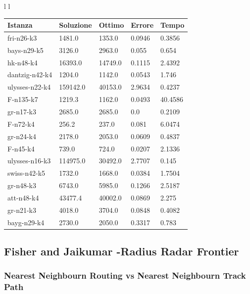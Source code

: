 \documentclass[]{article}
\begin{document}
\begin{tabular}{l l}
			\begin{tabular}{||l | l l l l||} 
				\hline
				Istanza & Soluzione & Ottimo & Errore & Tempo \\ [0.5ex] 
				\hline\hline
				fri-n26-k3 & 1481.0 & 1353.0 & 0.0946 & 0.3856  \\
				bays-n29-k5 & 3126.0 & 2963.0 & 0.055 & 0.654  \\
				hk-n48-k4 & 16393.0 & 14749.0 & 0.1115 & 2.4392  \\
				dantzig-n42-k4 & 1204.0 & 1142.0 & 0.0543 & 1.746  \\
				ulysses-n22-k4 & 159142.0 & 40153.0 & 2.9634 & 0.4237  \\
				F-n135-k7 & 1219.3 & 1162.0 & 0.0493 & 40.4586  \\
				gr-n17-k3 & 2685.0 & 2685.0 & 0.0 & 0.2109  \\
				F-n72-k4 & 256.2 & 237.0 & 0.081 & 6.0474  \\
				gr-n24-k4 & 2178.0 & 2053.0 & 0.0609 & 0.4837  \\
				F-n45-k4 & 739.0 & 724.0 & 0.0207 & 2.1336  \\
				ulysses-n16-k3 & 114975.0 & 30492.0 & 2.7707 & 0.145  \\
				swiss-n42-k5 & 1732.0 & 1668.0 & 0.0384 & 1.7504  \\
				gr-n48-k3 & 6743.0 & 5985.0 & 0.1266 & 2.5187  \\
				att-n48-k4 & 43477.4 & 40002.0 & 0.0869 & 2.275  \\
				gr-n21-k3 & 4018.0 & 3704.0 & 0.0848 & 0.4082  \\
				bayg-n29-k4 & 2730.0 & 2050.0 & 0.3317 & 0.783  \\		
				[1ex] 
				\hline
			\end{tabular}


\end{tabular}



\subsection{Fisher and Jaikumar -Radius Radar Frontier}

\subsubsection{Nearest Neighbourn Routing vs Nearest Neighbourn Track Path }
\end{document}
